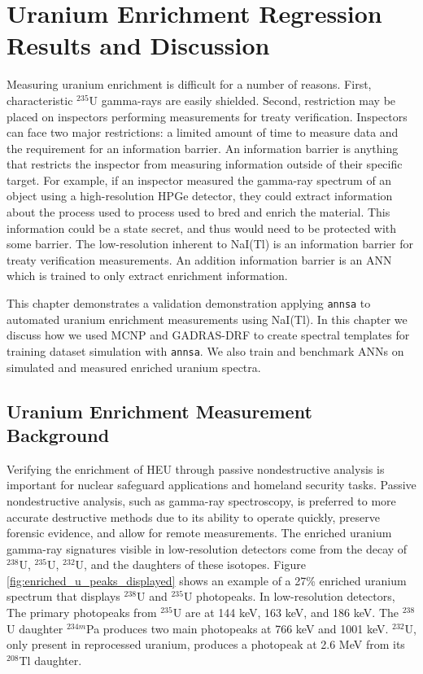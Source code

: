 \chapter[Uranium Enrichment Regression \newline Results and Discussion]{Uranium Enrichment Regression Results and Discussion}


Measuring uranium enrichment is difficult for a number of reasons. First, characteristic $^{235}$U gamma-rays are easily shielded. Second, restriction may be placed on inspectors performing measurements for treaty verification. Inspectors can face two major restrictions: a limited amount of time to measure data and the requirement for an information barrier. An information barrier is anything that restricts the inspector from measuring information outside of their specific target. For example, if an inspector measured the gamma-ray spectrum of an object using a high-resolution HPGe detector, they could extract information about the process used to process used to bred and enrich the material. This information could be a state secret, and thus would need to be protected with some barrier. The low-resolution inherent to NaI(Tl) is an information barrier for treaty verification measurements. An addition information barrier is an ANN which is trained to only extract enrichment information. 

This chapter demonstrates a validation demonstration applying \verb|annsa| to automated uranium enrichment measurements using NaI(Tl). In this chapter we discuss how we used MCNP and GADRAS-DRF to create spectral templates for training dataset simulation with \verb|annsa|. We also train and benchmark ANNs on simulated and measured enriched uranium spectra.


\section{Uranium Enrichment Measurement Background}

Verifying the enrichment of HEU through passive nondestructive analysis is important for nuclear safeguard applications and homeland security tasks. Passive nondestructive analysis, such as gamma-ray spectroscopy, is preferred to more accurate destructive methods due to its ability to operate quickly, preserve forensic evidence, and allow for remote measurements. The enriched uranium gamma-ray signatures visible in low-resolution detectors come from the decay of $^{238}$U, $^{235}$U, $^{232}$U, and the daughters of these isotopes. Figure \ref{fig:enriched_u_peaks_displayed} shows an example of a 27\% enriched uranium spectrum that displays $^{238}$U and $^{235}$U photopeaks. In low-resolution detectors, The primary photopeaks from $^{235}$U are at 144 keV, 163 keV, and 186 keV. The $^{238}$U daughter $^{234m}$Pa produces two main photopeaks at 766 keV and 1001 keV. $^{232}$U, only present in reprocessed uranium, produces a photopeak at 2.6 MeV from its $^{208}$Tl daughter.

